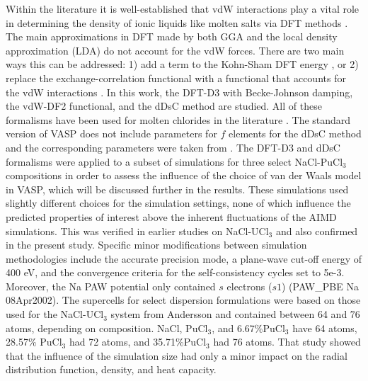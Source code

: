 \documentclass[review]{elsarticle}
\providecommand{\DIFaddtex}[1]{{\protect\color{blue} \sf #1}} %
\providecommand{\DIFaddbegin}{} %
\providecommand{\DIFaddend}{} %
\providecommand{\DIFadd}[1]{\texorpdfstring{\DIFaddtex{#1}}{#1}} %
\newcommand{\DIFaddincludegraphics}[2][]{{\color{blue}\fbox{\DIFOincludegraphics[#1]{#2}}}} %
\DeclareRobustCommand{\DIFaddbegin}{\DIFOaddbegin \let\includegraphics\DIFaddincludegraphics} %
\DeclareRobustCommand{\DIFaddend}{\DIFOaddend \let\includegraphics\DIFOincludegraphics} %
\begin{document}
Within the literature it is well-established that vdW interactions play a vital role in determining the density of ionic liquids like molten salts via DFT methods \cite{NAM2015224, Bengston2014, duemmler_liclkcl, duemmler_naclmgcl, ANDERSSON2022153836}. The main approximations in DFT made by both GGA and the local density approximation (LDA) do not account for the vdW forces. There are two main ways this can be addressed: 1) add a term to the Kohn-Sham DFT energy \cite{Grimme2006, Grimme2010}, or 2) replace the exchange-correlation functional with a functional that accounts for the vdW interactions \cite{Dion2004}. In this work, the DFT-D3 with Becke-Johnson damping, the vdW-DF2 functional, and the dDsC method are studied. All of these formalisms have been used for molten chlorides in the literature \cite{li2021molecular, duemmler_liclkcl, duemmler_naclmgcl, Dion2004, ANDERSSON2022153836}. The standard version of VASP does not include parameters for $f$ elements for the dDsC method and the corresponding parameters were taken from \cite{kim2012universal, schwerdtfeger2019table}. The DFT-D3 and dDsC formalisms were applied to a subset of simulations for three select NaCl-PuCl$_3$ compositions in order to assess the influence of the choice of van der Waals model in VASP, which will be discussed further in the results. These simulations used slightly different choices for the simulation settings, none of which influence the predicted properties of interest above the inherent fluctuations of the AIMD simulations. This was verified in earlier studies on NaCl-UCl$_3$ \cite{ANDERSSON2022153836} and also confirmed in the present study. Specific minor modifications between simulation methodologies include the accurate precision mode, a plane-wave cut-off energy of 400 eV, and the convergence criteria for the self-consistency cycles set to 5e-3. Moreover, the Na PAW potential only contained $s$ electrons ($s1$) (PAW\_PBE Na 08Apr2002). The supercells for select dispersion formulations were based on those used for the NaCl-UCl$_3$ system from Andersson \cite{ANDERSSON2022153836} and contained between 64 and 76 atoms, depending on composition. \DIFaddbegin \DIFadd{NaCl, PuCl$_3$, and 6.67\%PuCl$_3$ have 64 atoms, 28.57\% PuCl$_3$ had 72 atoms, and 35.71\%PuCl$_3$ had 76 atoms. That study showed that the influence of the simulation size had only a minor impact on the radial distribution function, density, and heat capacity. 
}\DIFaddend 
\end{document}

